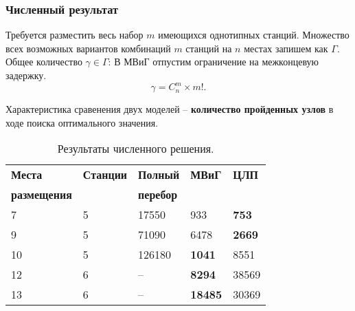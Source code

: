 \begin{frame}
    \frametitle{Численный результат}

    Требуется разместить весь набор $m$ имеющихся однотипных станций. Множество всех возможных вариантов комбинаций $m$ станций на  $n$ местах запишем как $\Gamma$. Общее количество $\gamma \in \Gamma$:
    В МВиГ отпустим ограничение на межконцевую задержку.
    \begin{displaymath}
    \gamma = C_n^m \times m!.
    \end{displaymath} 
 
    Характеристика сравенения двух моделей --  \textbf{количество пройденных узлов} в ходе поиска оптимального значения.



    \begin{table}[b]\centering
        \caption{Результаты численного решения.}\label{tab:problems_BF_BnB_ILP}
        \begin{tabular}{|l|l|l|l|l|}
        \hline
        \textbf{Места} & \textbf{Станции} &	\textbf{Полный}& \textbf{МВиГ} & \textbf{ЦЛП} \\ 
        \textbf{размещения} &  &	\textbf{перебор}&  &  \\
        \hline
        7 &		5 &	17550  &	933 &		\textbf{753}\\
        9 &		5 &	71090  &	6478 &		\textbf{2669}\\
        10 &	5 &	126180 &	\textbf{1041} &		8551\\
        12 &	6 &	-- &		\textbf{8294} &		38569\\
        13 & 	6 &	-- &		\textbf{18485} &	30369\\
        \hline
        \end{tabular}
    \end{table}

\end{frame}


